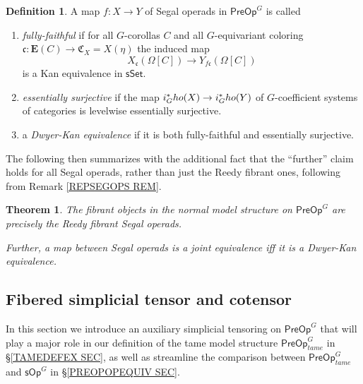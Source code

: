 \documentclass[a4paper,10pt]{article}%
\numberwithin{equation}{section}
\numberwithin{figure}{section}
\newtheorem{theorem}[equation]{Theorem}%
\theoremstyle{definition} %
\newtheorem{definition}[equation]{Definition}%
\newcommand{\1}{\ensuremath{\mathbbm 1}}%
\begin{document}
\begin{definition}
      A map $f \colon X \to Y$ of Segal operads in $\mathsf{PreOp}^G$ is called
\begin{enumerate}[label = (\roman*)]
	\item \textit{fully-faithful} if for all $G$-corollas $C$ and all $G$-equivariant coloring
	$\mathfrak{c} \colon \boldsymbol{E}(C) \to
	\mathfrak{C}_X  =X(\eta)$
	the induced map
\[
	X_{\mathfrak{c}}(\Omega[C]) \to 
	Y_{f\mathfrak{c}}(\Omega[C])
\]
            is a Kan equivalence in $\mathsf{sSet}$.
      \item \textit{essentially surjective} if the map 
      $i_G^{\**}ho(X) \to i_G^{\**}ho(Y)$ of $G$-coefficient systems of categories
            is levelwise essentially surjective.
      \item a \textit{Dwyer-Kan equivalence} if it is both fully-faithful and essentially surjective.
      \end{enumerate}
\end{definition}



The following then summarizes 
\cite[Remark 4.41, Thms. 5.51 and 5.48]{BP_edss}
with the additional fact that the ``further'' claim
holds for all Segal operads, rather than just the Reedy fibrant ones, 
following from Remark \ref{REPSEGOPS REM}.


\begin{theorem}\label{FIBPREOP THM}
	The fibrant objects in the normal model structure on 
	$\mathsf{PreOp}^G$
	are precisely the Reedy fibrant Segal operads.
	
	Further, a map between Segal operads is a joint equivalence iff it is a Dwyer-Kan equivalence.
\end{theorem}







\subsection{Fibered simplicial tensor and cotensor}
\label{FIBTENS_SEC}


In this section we introduce an auxiliary 
simplicial tensoring on
$\mathsf{PreOp}^G$
that will play a major role in our definition of the tame model structure 
$\mathsf{PreOp}^G_{tame}$ in \S \ref{TAMEDEFEX SEC},
as well as streamline the comparison 
between
$\mathsf{PreOp}^G_{tame}$
and 
$\mathsf{sOp}^G$ in \S \ref{PREOPOPEQUIV SEC}.
\end{document}
